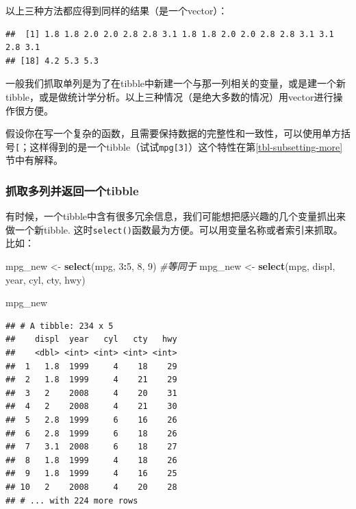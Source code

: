 \documentclass[]{book}
\newenvironment{Shaded}{\begin{snugshade}}{\end{snugshade}}
\newcommand{\CommentTok}[1]{\textcolor[rgb]{0.56,0.35,0.01}{\textit{#1}}}
\newcommand{\DecValTok}[1]{\textcolor[rgb]{0.00,0.00,0.81}{#1}}
\newcommand{\KeywordTok}[1]{\textcolor[rgb]{0.13,0.29,0.53}{\textbf{#1}}}
\newcommand{\NormalTok}[1]{#1}
\newcommand{\OperatorTok}[1]{\textcolor[rgb]{0.81,0.36,0.00}{\textbf{#1}}}
\newcommand{\StringTok}[1]{\textcolor[rgb]{0.31,0.60,0.02}{#1}}
\begin{document}
\begin{Shaded}
\end{Shaded}

以上三种方法都应得到同样的结果（是一个vector）：

\begin{verbatim}
##  [1] 1.8 1.8 2.0 2.0 2.8 2.8 3.1 1.8 1.8 2.0 2.0 2.8 2.8 3.1 3.1 2.8 3.1
## [18] 4.2 5.3 5.3
\end{verbatim}

一般我们抓取单列是为了在tibble中新建一个与那一列相关的变量，或是建一个新tibble，或是做统计学分析。以上三种情况（是绝大多数的情况）用vector进行操作很方便。

假设你在写一个复杂的函数，且需要保持数据的完整性和一致性，可以使用单方括号\texttt{{[}}；这样得到的是一个tibble（试试\texttt{mpg{[}3{]}}）这个特性在第\ref{tbl-subsetting-more}节中有解释。

\hypertarget{tibble}{%
\subsubsection{抓取多列并返回一个tibble}\label{tibble}}

有时候，一个tibble中含有很多冗余信息，我们可能想把感兴趣的几个变量抓出来做一个新tibble. 这时\texttt{select()}函数最为方便。可以用变量名称或者索引来抓取。比如：

\begin{Shaded}
\begin{Highlighting}[]
\NormalTok{mpg_new <-}\StringTok{ }\KeywordTok{select}\NormalTok{(mpg, }\DecValTok{3}\OperatorTok{:}\DecValTok{5}\NormalTok{, }\DecValTok{8}\NormalTok{, }\DecValTok{9}\NormalTok{)}
\CommentTok{#等同于}
\NormalTok{mpg_new <-}\StringTok{ }\KeywordTok{select}\NormalTok{(mpg, displ, year, cyl, cty, hwy)}

\NormalTok{mpg_new}
\end{Highlighting}
\end{Shaded}

\begin{verbatim}
## # A tibble: 234 x 5
##    displ  year   cyl   cty   hwy
##    <dbl> <int> <int> <int> <int>
##  1   1.8  1999     4    18    29
##  2   1.8  1999     4    21    29
##  3   2    2008     4    20    31
##  4   2    2008     4    21    30
##  5   2.8  1999     6    16    26
##  6   2.8  1999     6    18    26
##  7   3.1  2008     6    18    27
##  8   1.8  1999     4    18    26
##  9   1.8  1999     4    16    25
## 10   2    2008     4    20    28
## # ... with 224 more rows
\end{verbatim}
\end{document}
